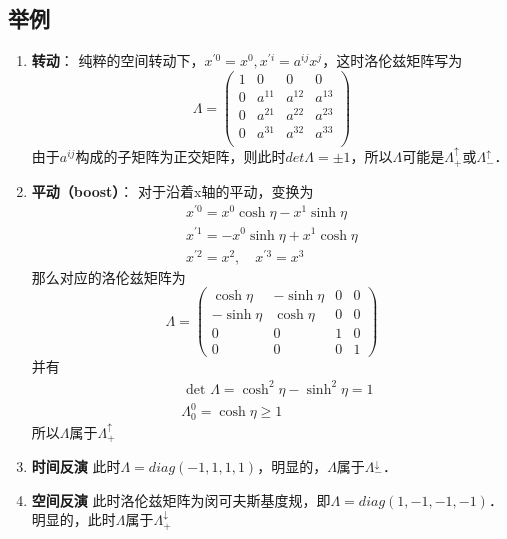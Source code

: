 \subsection{举例}
\begin{enumerate}
\item \textbf{转动}： 纯粹的空间转动下，$x^{\prime 0}=x^{0}, x^{\prime i}=a^{i j} x^{j}$，这时洛伦兹矩阵写为
\begin{equation}       %
\Lambda=\left(                 %
  \begin{array}{cccc}   %
   1& 0 & 0 & 0\\  %
   0& a^{11} &  a^{12} &  a^{13}\\  %
   0& a^{21} &  a^{22} &  a^{23}\\  %
   0& a^{31} &  a^{32} &  a^{33}\\  %
  \end{array}
\right)                 %
\end{equation}
由于$a^{ij}$构成的子矩阵为正交矩阵，则此时$det\Lambda=\pm1$，所以$\Lambda$可能是$\Lambda_{+}^{\uparrow}$或$\Lambda_{-}^{\uparrow}$．
\item \textbf{平动（boost）}： 对于沿着x轴的平动，变换为
\begin{equation}\begin{array}{c}
x^{\prime 0}=x^{0} \cosh \eta-x^{1} \sinh \eta \\
x^{\prime 1}=-x^{0} \sinh \eta+x^{1} \cosh \eta \\
x^{\prime 2}=x^{2}, \quad x^{\prime 3}=x^{3}
\end{array}\end{equation}
那么对应的洛伦兹矩阵为
\begin{equation}\Lambda=\left(\begin{array}{cccc}
\cosh \eta & -\sinh \eta & 0 & 0 \\
-\sinh \eta & \cosh \eta & 0 & 0 \\
0 & 0 & 1 & 0 \\
0 & 0 & 0 & 1
\end{array}\right)\end{equation}
并有
\begin{equation}\begin{aligned}
&\text { det } \Lambda=\cosh ^{2} \eta-\sinh ^{2} \eta=1\\
&\Lambda_{0}^{0}=\cosh \eta \geqslant 1
\end{aligned}\end{equation}
所以$\Lambda$属于$\Lambda_{+}^{\uparrow}$
\item \textbf{时间反演}
此时$\Lambda=diag(-1,1,1,1)$，明显的，$\Lambda$属于$\Lambda_{-}^{\downarrow}$．
\item \textbf{空间反演}
此时洛伦兹矩阵为闵可夫斯基度规，即$\Lambda=diag(1,-1,-1,-1)$．明显的，此时$\Lambda$属于$\Lambda_{+}^{\downarrow}$
\end{enumerate}
